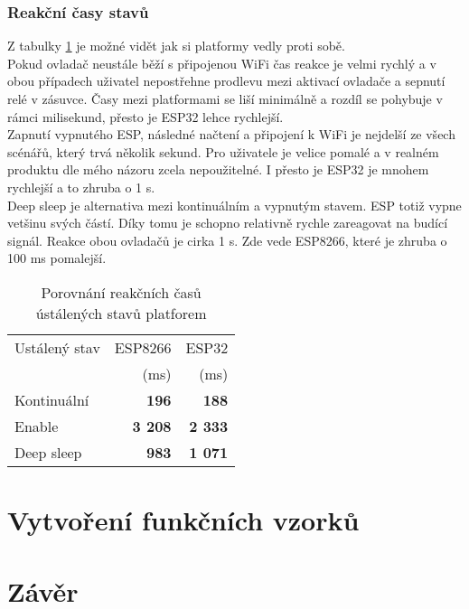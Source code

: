 \documentclass[a4paper, 12pt]{report}
\begin{document}
			\subsection{Reakční časy stavů}
			Z tabulky \ref{Porovnání klidové režimy čas} je možné vidět jak si platformy vedly proti sobě. \\
			Pokud ovladač neustále běží s připojenou WiFi čas reakce je velmi rychlý a v obou případech uživatel nepostřehne prodlevu mezi aktivací ovladače a sepnutí relé v zásuvce. Časy mezi platformami se liší minimálně a rozdíl se pohybuje v rámci milisekund, přesto je ESP32 lehce rychlejší. \\
			Zapnutí vypnutého ESP, následné načtení a připojení k WiFi je nejdelší ze všech scénářů, který trvá několik sekund. Pro uživatele je velice pomalé a v realném produktu dle mého názoru zcela nepoužitelné. I přesto je ESP32 je mnohem rychlejší a to zhruba o 1 \si{s}. \\
			Deep sleep je alternativa mezi kontinuálním a vypnutým stavem. ESP totiž vypne vetšinu svých částí. Díky tomu je schopno relativně rychle zareagovat na budící signál. Reakce obou ovladačů je cirka 1 \si{s}. Zde vede ESP8266, které je zhruba o 100 \si{ms} pomalejší.

			\begin{table}[h]
				\centering
				\caption{Porovnání reakčních časů ústálených stavů platforem}
				\begin{tabular}{||l|r r||}
					\hline
					Ustálený stav & ESP8266 & ESP32 \\
					& (ms) & (ms) \\
					\hline
					Kontinuální & {\bf 196} & {\bf 188}\\
					Enable & {\bf 3 208} & {\bf 2 333}\\
					Deep sleep & {\bf 983} & {\bf 1 071}\\
					\hline
				\end{tabular}
				\label{Porovnání klidové režimy čas}
			\end{table}





	\chapter{Vytvoření funkčních vzorků}
	\chapter{Závěr}

	\listoftables

	\listoffigures

\end{document}

